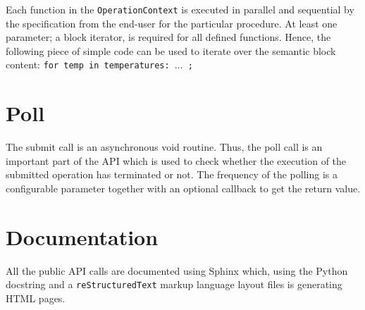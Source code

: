 Each function in the \texttt{OperationContext} is executed in parallel and sequential by the specification from the end-user for the particular procedure. At least one parameter; a block iterator, is required for all defined functions. Hence, the following piece of simple code can be used to iterate over the semantic block content: \texttt{for temp in temperatures: $\ldots$ ;}

\section{Poll}
The submit call is an asynchronous void routine. Thus, the poll call is an important part of the API which is used to check whether the execution of the submitted operation has terminated or not. The frequency of the polling is a configurable parameter together with an optional callback to get the return value.

\section{Documentation}
All the public API calls are documented using Sphinx \cite{PageSphinx} which, using the Python docstring and a \texttt{reStructuredText} markup language layout files is generating HTML pages.

